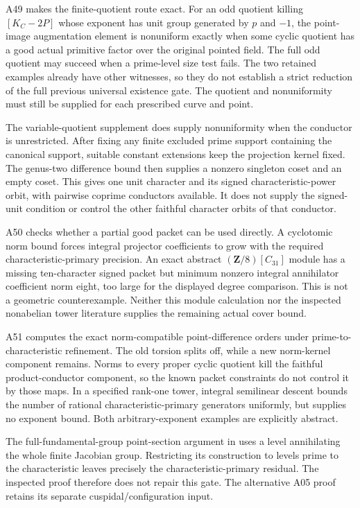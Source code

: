 A49 makes the finite-quotient route exact. For an odd quotient killing
$[K_C-2P]$ whose exponent has unit group generated by $p$ and $-1$,
the point-image augmentation element is nonuniform exactly when some
cyclic quotient has a good actual primitive factor over the original
pointed field. The full odd quotient may succeed when a prime-level
size test fails. The two retained examples already have other witnesses,
so they do not establish a strict reduction of the full previous
universal existence gate. The quotient and nonuniformity must still
be supplied for each prescribed curve and point.

The variable-quotient supplement does supply nonuniformity when the
conductor is unrestricted. After fixing any finite excluded prime support
containing the canonical support, suitable constant extensions keep the
projection kernel fixed. The genus-two difference bound then supplies a
nonzero singleton coset and an empty coset. This gives one unit character
and its signed characteristic-power orbit, with pairwise coprime
conductors available. It does not supply the signed-unit condition or
control the other faithful character orbits of that conductor.

A50 checks whether a partial good packet can be used directly. A
cyclotomic norm bound forces integral projector coefficients to grow with
the required characteristic-primary precision. An exact abstract
$(\mathbf Z/8)[C_{31}]$ module has a missing ten-character signed packet
but minimum nonzero integral annihilator coefficient norm eight, too
large for the displayed degree comparison. This is not a geometric
counterexample. Neither this module calculation nor the inspected
nonabelian tower literature supplies the remaining actual cover bound.

A51 computes the exact norm-compatible point-difference orders under
prime-to-charac\-teristic refinement. The old torsion splits off, while a
new norm-kernel component remains. Norms to every proper cyclic quotient
kill the faithful product-conductor component, so the known packet
constraints do not control it by those maps. In a specified rank-one
tower, integral semilinear descent bounds the number of rational
characteristic-primary generators uniformly, but supplies no exponent
bound. Both arbitrary-exponent examples are explicitly abstract.

The full-fundamental-group point-section argument in
\cite[\S3, Theorem~3, pp.~134--135]{Faltings840} uses a level annihilating
the whole finite Jacobian group. Restricting its construction to levels
prime to the characteristic leaves precisely the characteristic-primary
residual. The inspected proof therefore does not repair this gate.
The alternative A05 proof retains its separate cuspidal/configuration
input.

